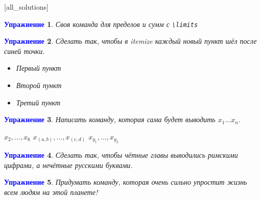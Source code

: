 \documentclass[pdftex, 12pt, a4paper]{article}
\newtheorem{problem}{\textcolor{blue}{Упражнение}}
\begin{document}

[all_solutions]

\begin{problem}
Своя команда для пределов и сумм с \verb|\limits|
\begin{sol}
\end{sol}
\end{problem}

\begin{problem}
Сделать так, чтобы в itemize каждый новый пункт шёл после синей точки.

\newcommand*{\MyPoint}{\tikz \draw [baseline, fill=blue,draw=blue] circle (2.5pt);}
\renewcommand{\labelitemi}{\MyPoint}

\begin{itemize}
\item Первый пункт
\item Второй пункт
\item Третий пункт
\end{itemize}
\end{problem}

\begin{problem}
Написать команду, которая сама будет выводить $x_1 \ldots x_n$.

\newcommand{\xvect}{\ensuremath{x_1,\ldots,x_n}}
\newcommand{\xvec}[2]{\ensuremath{x_{#1},\ldots,x_{#2}}}

\xvec{2}{6} 
\xvec{(a,b)}{(c,d)}
\xvec{y_1}{y_2}

\end{problem}

\begin{problem}
Сделать так, чтобы чётные главы выводились римскими цифрами, а нечётные русскими буквами.
\begin{sol}
\end{sol}
\end{problem}

\begin{problem}
Придумать команду, которая очень сильно упростит жизнь всем людям на этой планете!
\begin{sol}
\end{sol}
\end{problem}




\end{document}
